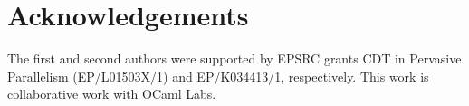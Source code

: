 \documentclass[preprint,numbers]{sigplanconf}
\begin{document}

\section{Acknowledgements}
The first and second authors were supported by EPSRC grants CDT in
Pervasive Parallelism (EP/L01503X/1) and EP/K034413/1,
respectively.  This work is collaborative work with OCaml Labs.

 \softraggedright

\end{document}
